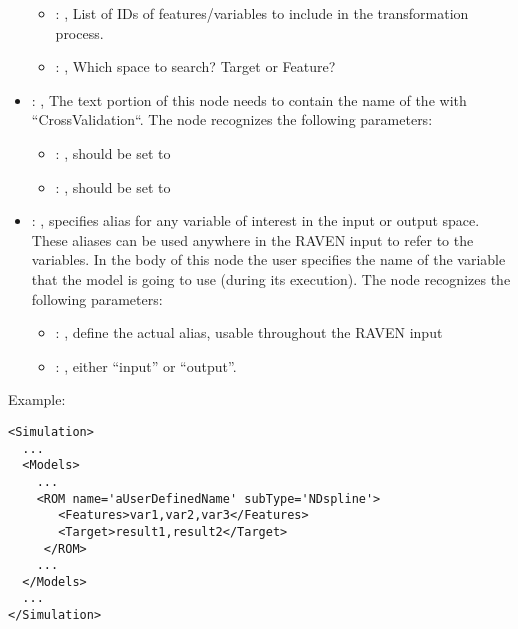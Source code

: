 \begin{itemize}
\begin{itemize}
        \item {}: , 
          List of IDs of features/variables to include in the transformation process.

        \item {}: , 
          Which space to search? Target or Feature?
      \end{itemize}

    \item {}: , 
      The text portion of this node needs to contain the name of the  with
               ``CrossValidation``.
      The  node recognizes the following parameters:
        \begin{itemize}
          \item {}: , 
            should be set to 
          \item {}: , 
            should be set to 
      \end{itemize}

    \item {}: , 
      specifies alias for         any variable of interest in the input or output space. These
      aliases can be used anywhere in the RAVEN input to         refer to the variables. In the body
      of this node the user specifies the name of the variable that the model is going to use
      (during its execution).
      The  node recognizes the following parameters:
        \begin{itemize}
          \item {}: , 
            define the actual alias, usable throughout the RAVEN input
          \item {}: , 
            either ``input'' or ``output''.
      \end{itemize}
  \end{itemize}

\hspace{24pt}
Example:
\begin{lstlisting}[style=XML]
<Simulation>
  ...
  <Models>
    ...
    <ROM name='aUserDefinedName' subType='NDspline'>
       <Features>var1,var2,var3</Features>
       <Target>result1,result2</Target>
     </ROM>
    ...
  </Models>
  ...
</Simulation>
\end{lstlisting}


